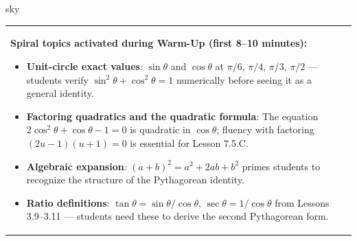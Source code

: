 \documentclass[10pt]{article}
\begin{document}
\begin{skillbox}{sky}
\begin{tabularx}{\linewidth}{@{}X c@{}}
\begin{minipage}[t]{0.96\linewidth}\vspace{0pt}
\textbf{Spiral topics activated during Warm-Up (first 8--10 minutes):}
\begin{itemize}[leftmargin=1.4em, itemsep=2pt]
  \item \textbf{Unit-circle exact values}: $\sin\theta$ and $\cos\theta$ at
    $\pi/6$, $\pi/4$, $\pi/3$, $\pi/2$ --- students verify $\sin^2\theta + \cos^2\theta = 1$
    numerically before seeing it as a general identity.
  \item \textbf{Factoring quadratics and the quadratic formula}: The equation
    $2\cos^2\theta + \cos\theta - 1 = 0$ is quadratic in $\cos\theta$; fluency
    with factoring $(2u - 1)(u + 1) = 0$ is essential for Lesson 7.5.C.
  \item \textbf{Algebraic expansion}: $(a+b)^2 = a^2 + 2ab + b^2$ primes
    students to recognize the structure of the Pythagorean identity.
  \item \textbf{Ratio definitions}: $\tan\theta = \sin\theta / \cos\theta$,
    $\sec\theta = 1/\cos\theta$ from Lessons 3.9--3.11 --- students need these
    to derive the second Pythagorean form.
\end{itemize}
\end{minipage}
&
\end{tabularx}
\end{skillbox}

\vspace{0.08in}
\end{document}
